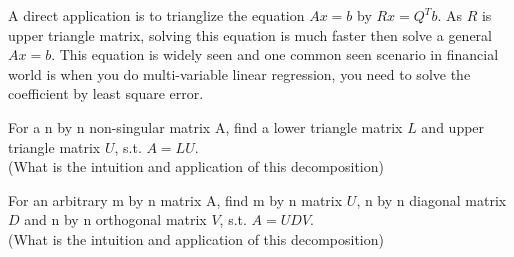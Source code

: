 \begin{teacher}
\begin{sol}
A direct application is to trianglize the equation $Ax=b$ by $Rx=Q^Tb$. As $R$ is upper triangle matrix, solving this equation is much faster then solve a general $Ax=b$. This equation is widely seen and one common seen scenario in financial world is when you do multi-variable linear regression, you need to solve the coefficient by least square error.
\end{sol}
\end{teacher}

\begin{exe}[LU Decomposition]
For a n by n non-singular matrix A, find a lower triangle matrix $L$ and upper triangle matrix $U$, s.t. $A=LU$.\\
(What is the intuition and application of this decomposition)
\end{exe}
\begin{teacher}
\begin{sol}
\end{sol}
\end{teacher}

\begin{exe}
For an arbitrary m by n matrix A, find m by n matrix $U$, n by n diagonal matrix $D$ and n by n orthogonal matrix $V$, s.t. $A=UDV$.\\
(What is the intuition and application of this decomposition)
\end{exe}
\begin{teacher}
\begin{sol}
\end{sol}
\end{teacher}






































